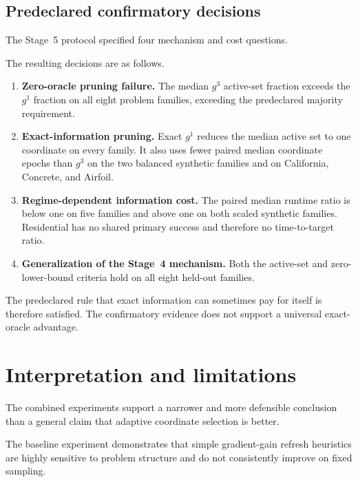 \documentclass[11pt]{article}
\begin{document}
\subsection{Predeclared confirmatory decisions}

The Stage~5 protocol specified four mechanism and cost questions.

The resulting decisions are as follows.

\begin{enumerate}
    \item
    \textbf{Zero-oracle pruning failure.}
    The median $g^3$ active-set fraction exceeds the $g^1$ fraction on
    all eight problem families, exceeding the predeclared majority
    requirement.

    \item
    \textbf{Exact-information pruning.}
    Exact $g^1$ reduces the median active set to one coordinate on every
    family. It also uses fewer paired median coordinate epochs than
    $g^3$ on the two balanced synthetic families and on California,
    Concrete, and Airfoil.

    \item
    \textbf{Regime-dependent information cost.}
    The paired median runtime ratio is below one on five families and
    above one on both scaled synthetic families. Residential has no
    shared primary success and therefore no time-to-target ratio.

    \item
    \textbf{Generalization of the Stage~4 mechanism.}
    Both the active-set and zero-lower-bound criteria hold on all eight
    held-out families.
\end{enumerate}

The predeclared rule that exact information can sometimes pay for itself
is therefore satisfied. The confirmatory evidence does not support a
universal exact-oracle advantage.


\section{Interpretation and limitations}

The combined experiments support a narrower and more defensible
conclusion than a general claim that adaptive coordinate selection is
better.

The baseline experiment demonstrates that simple gradient-gain refresh
heuristics are highly sensitive to problem structure and do not
consistently improve on fixed sampling.
\end{document}
